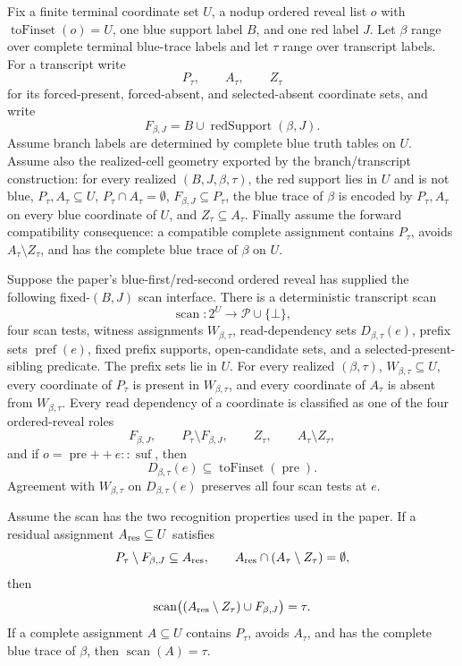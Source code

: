 \begin{helper}
Fix a finite terminal coordinate set \(U\), a nodup ordered reveal list
\(o\) with \(\operatorname{toFinset}(o)=U\), one blue support label \(B\),
and one red label \(J\).  Let \(\beta\) range over complete terminal
blue-trace labels and let \(\tau\) range over transcript labels.  For a
transcript write
\[
P_\tau,\qquad A_\tau,\qquad Z_\tau
\]
for its forced-present, forced-absent, and selected-absent coordinate sets,
and write
\[
F_{\beta,J}=B\cup \operatorname{redSupport}(\beta,J).
\]
Assume branch labels are determined by complete blue truth tables on \(U\).
Assume also the realized-cell geometry exported by the branch/transcript
construction: for every realized \((B,J,\beta,\tau)\), the red support lies
in \(U\) and is not blue, \(P_\tau,A_\tau\subseteq U\),
\(P_\tau\cap A_\tau=\emptyset\), \(F_{\beta,J}\subseteq P_\tau\), the blue
trace of \(\beta\) is encoded by \(P_\tau,A_\tau\) on every blue coordinate
of \(U\), and \(Z_\tau\subseteq A_\tau\).  Finally assume the forward
compatibility consequence: a compatible complete assignment contains
\(P_\tau\), avoids \(A_\tau\setminus Z_\tau\), and has the complete blue
trace of \(\beta\) on \(U\).

Suppose the paper's blue-first/red-second ordered reveal has supplied the
following fixed-\((B,J)\) scan interface.  There is a deterministic
transcript scan
\[
\operatorname{scan}:2^U\to\mathcal P\cup\{\bot\},
\]
four scan tests, witness assignments \(W_{\beta,\tau}\), read-dependency
sets \(D_{\beta,\tau}(e)\), prefix sets \(\operatorname{pref}(e)\), fixed
prefix supports, open-candidate sets, and a selected-present-sibling
predicate.  The prefix sets lie in \(U\).  For every realized
\((\beta,\tau)\), \(W_{\beta,\tau}\subseteq U\), every coordinate of
\(P_\tau\) is present in \(W_{\beta,\tau}\), and every coordinate of
\(A_\tau\) is absent from \(W_{\beta,\tau}\).  Every read dependency of a
coordinate is classified as one of the four ordered-reveal roles
\[
F_{\beta,J},\qquad P_\tau\setminus F_{\beta,J},\qquad
Z_\tau,\qquad A_\tau\setminus Z_\tau ,
\]
and if \(o=\operatorname{pre}\mathbin{+\!\!+}e::\operatorname{suf}\), then
\[
D_{\beta,\tau}(e)\subseteq \operatorname{toFinset}(\operatorname{pre}).
\]
Agreement with \(W_{\beta,\tau}\) on \(D_{\beta,\tau}(e)\) preserves all
four scan tests at \(e\).

Assume the scan has the two recognition properties used in the paper.  If a
residual assignment \(A_{\rm res}\subseteq U\) satisfies
\[
P_\tau\setminus F_{\beta,J}\subseteq A_{\rm res},\qquad
A_{\rm res}\cap(A_\tau\setminus Z_\tau)=\emptyset ,
\]
then
\[
\operatorname{scan}\bigl((A_{\rm res}\setminus Z_\tau)\cup F_{\beta,J}\bigr)
=\tau .
\]
If a complete assignment \(A\subseteq U\) contains \(P_\tau\), avoids
\(A_\tau\), and has the complete blue trace of \(\beta\), then
\(\operatorname{scan}(A)=\tau\).


\end{helper}
